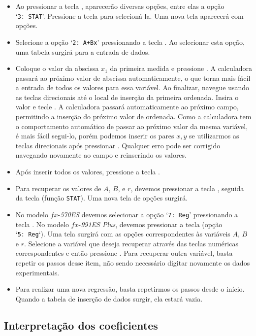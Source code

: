 \begin{itemize}
	\item Ao pressionar a tecla , aparecerão diversas opções, entre elas a opção `\texttt{3:~STAT}'. Pressione a tecla  para selecioná-la. Uma nova tela aparecerá com opções.
	\item Selecione a opção `\texttt{2:~A+Bx}' pressionando a tecla . Ao selecionar esta opção, uma tabela surgirá para a entrada de dados.
	\item Coloque o valor da abscissa $x_1$ da primeira medida e pressione \keystroke{~=~}. A calculadora passará ao próximo valor de abscissa automaticamente, o que torna mais fácil a entrada de todos os valores para essa variável. Ao finalizar, navegue usando as teclas direcionais até o local de inserção da primeira ordenada. Insira o valor e tecle \keystroke{~=~}. A calculadora passará automaticamente ao próximo campo, permitindo a inserção do próximo valor de ordenada. Como a calculadora tem o comportamento automático de passar ao próximo valor da mesma variável, é mais fácil segui-lo, porém podemos inserir os pares $x,y$ se utilizarmos as teclas direcionais após pressionar \keystroke{~=~}. Qualquer erro pode ser corrigido navegando novamente ao campo e reinserindo os valores.
	\item Após inserir todos os valores, pressione a tecla .
	\item Para recuperar os valores de $A$, $B$, e $r$, devemos pressionar a tecla , seguida da tecla  (função \texttt{STAT}). Uma nova tela de opções surgirá.
	\item No modelo $fx$-\textit{570ES} devemos selecionar a opção `\texttt{7:~Reg}' pressionando a tecla . No modelo $fx$-\textit{991ES Plus}, devemos pressionar a tecla  (opção `\texttt{5:~Reg}`). Uma tela surgirá com as opções correspondentes às variáveis $A$, $B$ e $r$. Selecione a variável que deseja recuperar através das teclas numéricas correspondentes e então pressione \keystroke{~=~}. Para recuperar outra variável, basta repetir os passos desse ítem, não sendo necessário digitar novamente os dados experimentais.
	\item Para realizar uma nova regressão, basta repetirmos os passos desde o início. Quando a tabela de inserção de dados surgir, ela estará vazia.
\end{itemize}

\subsection{Interpretação dos coeficientes}

